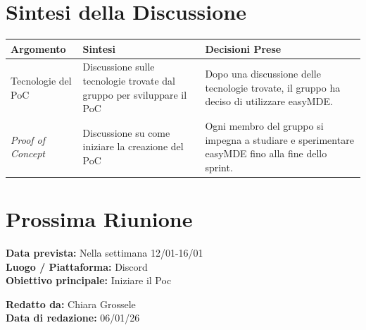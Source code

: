 \documentclass[a4paper,12pt]{article}
\begin{document}
\section*{ Sintesi della Discussione}

\begin{longtable}{|p{}|p{}|p{}|}
\hline
\textbf{Argomento} & \textbf{Sintesi} & \textbf{Decisioni Prese} \\ \hline
Tecnologie del PoC & Discussione sulle tecnologie trovate dal gruppo per sviluppare il PoC & Dopo una discussione delle tecnologie trovate, il gruppo ha deciso di utilizzare easyMDE.\\ \hline
\textit{Proof of Concept} & Discussione su come iniziare la creazione del PoC & Ogni membro del gruppo si impegna a studiare e sperimentare easyMDE fino alla fine dello sprint. \\ \hline
\end{longtable}

\section*{ Prossima Riunione}
\textbf{Data prevista:} Nella settimana 12/01-16/01 \\
\textbf{Luogo / Piattaforma:} Discord \\
\textbf{Obiettivo principale:} Iniziare il Poc


\textbf{Redatto da:} Chiara Grossele \\
\textbf{Data di redazione:} 06/01/26
\end{document}

